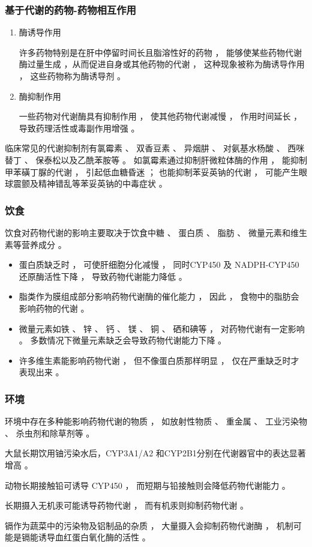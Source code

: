 \documentclass[dvipsnames, svgnames, x11names]{beamer}
\begin{document}
\begin{frame}
    \frametitle{基于代谢的药物-药物相互作用}
    \begin{enumerate}
      \item 酶诱导作用
      
      许多药物特别是在肝中停留时间长且脂溶性好的药物 ， 能够使某些药物代谢酶过量生成 ，从而促进自身或其他药物的代谢 ， 这种现象被称为酶诱导作用 ， 这些药物称为酶诱导剂 。 
      \item 酶抑制作用
      
      一些药物对代谢酶具有抑制作用 ， 使其他药物代谢减慢 ， 作用时间延长 ， 导致药理活性或毒副作用增强 。 
    \end{enumerate}
    \begin{blankblock}{}
      临床常见的代谢抑制剂有氯霉素 、 双香豆素 、 异烟肼 、 对氨基水杨酸 、 西咪替丁 、 保泰松以及乙酰苯胺等 。 如氯霉素通过抑制肝微粒体酶的作用 ， 能抑制甲苯磺丁脲的代谢 ， 引起低血糖昏迷 ； 也能抑制苯妥英钠的代谢 ， 可能产生眼球震颤及精神错乱等苯妥英钠的中毒症状 。
    \end{blankblock}
\end{frame}


\begin{frame}
    \frametitle{饮食}
    饮食对药物代谢的影响主要取决于饮食中糖 、 蛋白质 、 脂肪 、 微量元素和维生素等营养成分 。
    \begin{itemize}
      \item 蛋白质缺乏时 ， 可使肝细胞分化减慢 ， 同时CYP450 及 NADPH-CYP450 还原酶活性下降 ， 导致药物代谢能力降低 。
      \item 脂类作为膜组成部分影响药物代谢酶的催化能力 ， 因此 ， 食物中的脂肪会影响药物的代谢 。
      \item 微量元素如铁 、 锌 、 钙 、 镁 、 铜 、 硒和碘等 ， 对药物代谢有一定影响 。 多数情况下微量元素缺乏会导致药物代谢能力下降 。
      \item 许多维生素能影响药物代谢 ， 但不像蛋白质那样明显 ， 仅在严重缺乏时才表现出来 。
    \end{itemize}
\end{frame}


\begin{frame}
    \frametitle{环境}
    环境中存在多种能影响药物代谢的物质 ， 如放射性物质 、 重金属 、 工业污染物 、 杀虫剂和除草剂等 。
    \begin{blankblock}{}
      大鼠长期饮用铀污染水后，CYP3A1/A2 和CYP2B1分别在代谢器官中的表达显著增高 。 
      
      动物长期接触铅可诱导 CYP450 ， 而短期与铅接触则会降低药物代谢能力 。 
      
      长期摄入无机汞可能诱导药物代谢 ， 而有机汞则抑制药物代谢 。 
      
      镉作为蔬菜中的污染物及铝制品的杂质 ， 大量摄入会抑制药物代谢酶 ， 机制可能是镉能诱导血红蛋白氧化酶的活性 。
    \end{blankblock}
\end{frame}
\end{document}
